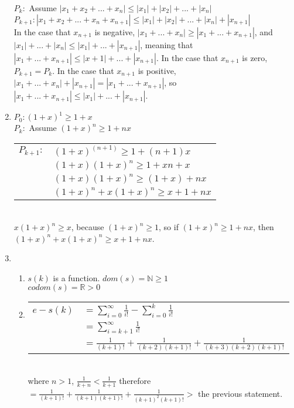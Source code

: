 \documentclass{article}
\begin{document}
\begin{enumerate}
			$P_k:$ Assume $|x_1 + x_2 + ... + x_n| \leq |x_1| + |x_2| + ... + |x_n|$\\
			$P_{k+1}: |x_1 + x_2 + ... + x_n + x_{n+1}| \leq |x_1| + |x_2| + ... + |x_n| + |x_{n+1}|$\\
			In the case that $x_{n+1}$ is negative, $|x_1 + ... + x_n| \geq |x_1 + ... + x_{n+1}|$, and $|x_1| + ... + |x_n| \leq |x_1| + ... + |x_{n+1}|$, meaning that $|x_1 + ... + x_{n+1}| \leq |x+1| + ... + |x_{n+1}|$. In the case that $x_{n+1}$ is zero, $P_{k+1} = P_{k}$. In the case that $x_{n+1}$ is positive, $|x_1 + ... + x_n| + |x_{n+1}| = |x_1 + ... + x_{n+1}|$, so $|x_1 + ... + x_{n+1}| \leq |x_1| + ... + |x_{n+1}|$.
		\item
			$P_0: (1+x)^1 \geq 1+x$\\
			$P_k:$ Assume $(1+x)^n \geq 1+nx$\\
			\begin{tabular}{l l}
				$P_{k+1}:$ & $ (1+x)^(n+1) \geq 1 + (n+1)x$\\
				& $(1+x)(1+x)^n \geq 1 + xn + x$\\
				& $(1+x)(1+x)^n \geq (1+x) + nx$\\
				& $(1+x)^n + x(1+x)^n \geq x + 1 + nx$\\
			\end{tabular}\\
			$x(1+x)^n \geq x$, because $(1+x)^n \geq 1$, so if $(1+x)^n \geq 1+nx$, then $(1+x)^n + x(1+x)^n \geq x + 1 + nx$.\\
		\item
			\begin{enumerate}
				\item
					$s(k)$ is a function.
					$dom(s) = \mathbb{N} \geq 1$\\
					$codom(s) = \mathbb{R} > 0$\\
				\item
					\begin{tabular}{l l}
						$e-s(k)$ & $ = \sum\limits_{i=0}^{\infty} \frac{1}{i!} - \sum\limits_{i=0}^{k} \frac{1}{i!}$\\
						& $= \sum\limits_{i=k+1}^{\infty} \frac{1}{i!} $\\
						& $= \frac{1}{(k+1)!} + \frac{1}{(k+2)(k+1)!} + \frac{1}{(k+3)(k+2)(k+1)!}$\\
					\end{tabular}\\
					where $n > 1$, $\frac{1}{k+n} < \frac{1}{k+1}$ therefore \\
					$= \frac{1}{(k+1)!} + \frac{1}{(k+1)(k+1)!} + \frac{1}{(k+1)^2(k+1)!} >$ the previous statement. \\

\end{enumerate}
\end{enumerate}
\end{document}
